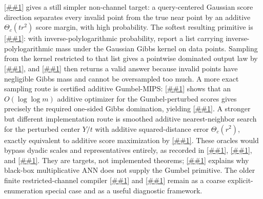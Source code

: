 \documentclass[10pt]{article}
\newcommand{\cref}[1]{\ref{##1}}
\newcommand{\Cref}[1]{\ref{##1}}
\theoremstyle{definition}
\begin{document}
\Cref{lem:smoothed-max-score-margin} gives a still simpler non-channel target: a query-centered Gaussian score direction separates every invalid point from the true near point by an additive $\Theta_c(tr^2)$ score margin, with high probability. The softest resulting primitive is \cref{asm:smoothed-gibbs}: with inverse-polylogarithmic probability, report a list carrying inverse-polylogarithmic mass under the Gaussian Gibbs kernel on data points. Sampling from the kernel restricted to that list gives a pointwise dominated output law by \cref{lem:captured-gibbs-domination}, and \cref{lem:smoothed-gibbs-suffices} then returns a valid answer because invalid points have negligible Gibbs mass and cannot be oversampled too much. A more exact sampling route is certified additive Gumbel-MIPS: \cref{lem:gumbel-additive-domination} shows that an $O(\log\log m)$ additive optimizer for the Gumbel-perturbed scores gives precisely the required one-sided Gibbs domination, yielding \cref{prop:gumbel-mips-polylog}. A stronger but different implementation route is smoothed additive nearest-neighbor search for the perturbed center $Y/t$ with additive squared-distance error $\Theta_c(r^2)$, exactly equivalent to additive score maximization by \cref{lem:score-max-additive-nn}. These oracles would bypass dyadic scales and representatives entirely, as recorded in \cref{prop:smoothed-gibbs-polylog}, \cref{prop:gumbel-mips-polylog}, and \cref{prop:smoothed-score-max-polylog}. They are targets, not implemented theorems; \cref{rem:gumbel-mips-not-ann} explains why black-box multiplicative ANN does not supply the Gumbel primitive. The older finite restricted-channel compiler \cref{asm:finite-restricted-channel} and \cref{prop:finite-channel-polylog} remain as a coarse explicit-enumeration special case and as a useful diagnostic framework.
\end{document}
